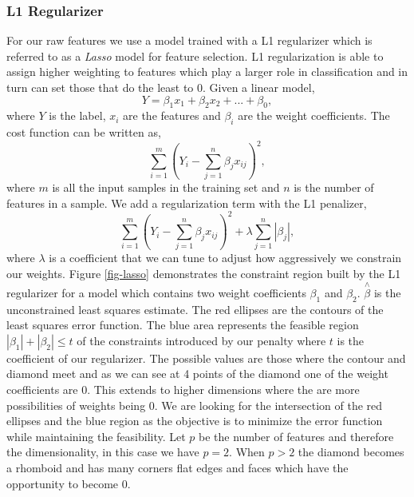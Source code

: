 \subsubsection{L1 Regularizer} For our raw features we use a model trained with a L1 regularizer which is referred to as a \emph{Lasso} model for feature selection. L1 regularization is able to assign higher weighting to features which play a larger role in classification and in turn can set those that do the least to 0. 
Given a linear model,
\begin{equation}
Y = \beta_{1}x_{1} + \beta_{2}x_{2} + ... + \beta_{0},
\end{equation}
where $Y$ is the label, $x_{i}$ are the features and $\beta_{i}$ are the weight coefficients.
The cost function can be written as,
\begin{equation}
\sum_{i=1}^{m}(Y_{i} - \sum_{j=1}^{n} \beta_{j}x_{ij})^{2},
\end{equation}
where $m$ is all the input samples in the training set and $n$ is the number of features in a sample.
We add a regularization term with the L1 penalizer,
\begin{equation}
        \sum_{i=1}^{m}(Y_{i} - \sum_{j=1}^{n} \beta_{j}x_{ij})^{2} + \lambda \sum_{j=1}^{n} |\beta_{j}|,
\end{equation}
where $\lambda$ is a coefficient that we can tune to adjust how aggressively we constrain our weights. Figure \ref{fig-lasso} demonstrates the constraint region built by the L1 regularizer for a model which contains two weight coefficients $\beta_{1}$ and $\beta_{2}$. $\overset{\wedge}{\beta}$ is the unconstrained least squares estimate. The red ellipses are the contours of the least squares error function. The blue area represents the feasible region $|\beta_{1}| + |\beta_{2}| \leq t$ of the constraints introduced by our penalty where $t$ is the coefficient of our regularizer. The possible values are those where the contour and diamond meet and as we can see  at 4 points of the diamond one of the weight coefficients are 0. This extends to higher dimensions where the are more possibilities of weights being 0. We are looking for the intersection of the red ellipses and the blue region as the objective is to minimize the error function while maintaining the feasibility. Let $p$ be the number of features and therefore the dimensionality, in this case we have $p = 2$. When $p > 2$ the diamond becomes a rhomboid and has many corners flat edges and faces which have the opportunity to become 0.

